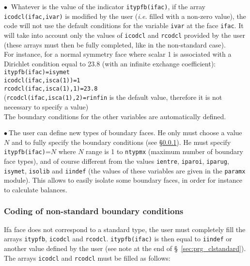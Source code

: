 {{{
$\bullet\ $ Whatever is the value of the indicator \texttt{itypfb(ifac)}, if
the array \texttt{icodcl(ifac,ivar)} is modified by the user ({\em i.e.} filled
with a non-zero value), the code will not use the default
conditions for the variable \texttt{ivar} at the face \texttt{ifac}. It will
take into account only the values of \texttt{icodcl} and \texttt{rcodcl} provided by the
user (these arrays must then be fully completed, like in the non-standard case). \\
For instance, for a normal symmetry face where scalar 1 is associated with a
Dirichlet condition equal to 23.8 (with an infinite exchange
coefficient):\\
\hspace*{2cm}\texttt{itypfb(ifac)=isymet}\\
\hspace*{2cm}\texttt{icodcl(ifac,isca(1))=1}\\
\hspace*{2cm}\texttt{rcodcl(ifac,isca(1),1)=23.8}\\
(\texttt{rcodcl(ifac,isca(1),2)=rinfin} is the default value, therefore it is
not necessary to specify a value)\\
The boundary conditions for the other variables are automatically
defined.

\noindent
$\bullet\ $The user can define new types of boundary faces. He only must
choose a value $N$ and to fully specify the boundary conditions (see
\S\ref{sec:prg_clnonstandard}). He must specify
\texttt{itypfb(ifac)}=$N$ where $N$ range is 1 to
\texttt{ntypmx} (maximum number of boundary face types), and of
course different from the values \texttt{ientre}, \texttt{iparoi},
\texttt{iparug}, \texttt{isymet}, \texttt{isolib} and \texttt{iindef} (the values
of these variables are given in the \texttt{paramx} module). This allows to
easily isolate some boundary faces, in order for instance to calculate balances.

\subsubsection{Coding of non-standard boundary conditions}
\label{sec:prg_clnonstandard}%
Ifa face does not correspond to a standard type, the user
must completely fill the arrays \texttt{itypfb}, \texttt{icodcl} and
\texttt{rcodcl}. \texttt{itypfb(ifac)} is then equal to \texttt{iindef}
or another value defined by the user (see note at the end of
\S~\ref{sec:prg_clstandard}). The arrays \texttt{icodcl} and \texttt{rcodcl}
must be filled as follows:

}}}
